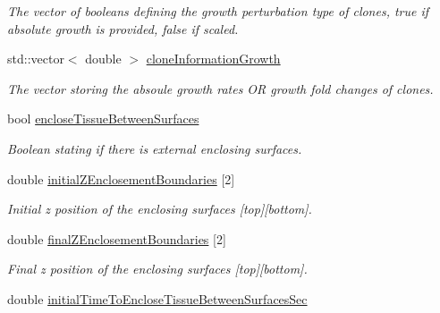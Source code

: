 \begin{DoxyCompactItemize}
\begin{DoxyCompactList}\small\item\em The vector of booleans defining the growth perturbation type of clones, true if absolute growth is provided, false if scaled. \end{DoxyCompactList}\item 
\hypertarget{classSimulation_ab1abad698b27f9687e12b940eb1a3071}{}std\+::vector$<$ double $>$ \hyperlink{classSimulation_ab1abad698b27f9687e12b940eb1a3071}{clone\+Information\+Growth}\label{classSimulation_ab1abad698b27f9687e12b940eb1a3071}

\begin{DoxyCompactList}\small\item\em The vector storing the absoule growth rates O\+R growth fold changes of clones. \end{DoxyCompactList}\item 
\hypertarget{classSimulation_a5f78710998d8706eb7e15857eb03ccc6}{}bool \hyperlink{classSimulation_a5f78710998d8706eb7e15857eb03ccc6}{enclose\+Tissue\+Between\+Surfaces}\label{classSimulation_a5f78710998d8706eb7e15857eb03ccc6}

\begin{DoxyCompactList}\small\item\em Boolean stating if there is external enclosing surfaces. \end{DoxyCompactList}\item 
\hypertarget{classSimulation_a4b273b605ad9f2dafb4b4ea22b3a4d92}{}double \hyperlink{classSimulation_a4b273b605ad9f2dafb4b4ea22b3a4d92}{initial\+Z\+Enclosement\+Boundaries} \mbox{[}2\mbox{]}\label{classSimulation_a4b273b605ad9f2dafb4b4ea22b3a4d92}

\begin{DoxyCompactList}\small\item\em Initial z position of the enclosing surfaces \mbox{[}top\mbox{]}\mbox{[}bottom\mbox{]}. \end{DoxyCompactList}\item 
\hypertarget{classSimulation_a8741a8f397eceac3a4f7d40009ada8a4}{}double \hyperlink{classSimulation_a8741a8f397eceac3a4f7d40009ada8a4}{final\+Z\+Enclosement\+Boundaries} \mbox{[}2\mbox{]}\label{classSimulation_a8741a8f397eceac3a4f7d40009ada8a4}

\begin{DoxyCompactList}\small\item\em Final z position of the enclosing surfaces \mbox{[}top\mbox{]}\mbox{[}bottom\mbox{]}. \end{DoxyCompactList}\item 
\hypertarget{classSimulation_adc4fdde612c109d01508eb4c8d49f76a}{}double \hyperlink{classSimulation_adc4fdde612c109d01508eb4c8d49f76a}{initial\+Time\+To\+Enclose\+Tissue\+Between\+Surfaces\+Sec}\label{classSimulation_adc4fdde612c109d01508eb4c8d49f76a}


\end{DoxyCompactItemize}
